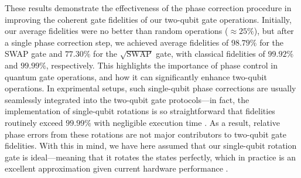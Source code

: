 \documentclass{subfiles}
\begin{document}
These results demonstrate the effectiveness of the phase correction procedure in improving the coherent gate fidelities of our two-qubit gate operations. Initially, our average fidelities were no better than random operations ($\approx 25\%$), but after a single phase correction step, we achieved average fidelities of $98.79\%$ for the SWAP gate and $77.30\%$ for the $\sqrt{\text{SWAP}}$ gate, with classical fidelities of $99.92\%$ and $99.99\%$, respectively. This highlights the importance of phase control in quantum gate operations, and how it can significantly enhance two-qubit operations. In exprimental setups, such single-qubit phase corrections are usually seamlessly integrated into the two-qubit gate protocols—in fact, the implementation of single-qubit rotations is so straightforward that fidelities routinely exceed $99.99\%$ with negligible execution time \cite{ballance2016high}. As a result, relative phase errors from these rotations are not major contributors to two-qubit gate fidelities. With this in mind, we have here assumed that our single-qubit rotation gate is ideal—meaning that it rotates the states perfectly, which in practice is an excellent approximation given current hardware performance \cite{nielsen2010quantum}. 
\end{document}
